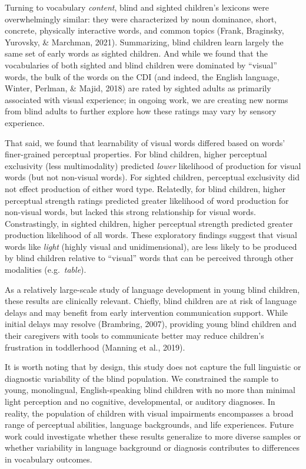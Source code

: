 \documentclass[
  man,floatsintext]{apa6}
\begin{document}
Turning to vocabulary \emph{content}, blind and sighted children's lexicons were overwhelmingly similar: they were characterized by noun dominance, short, concrete, physically interactive words, and common topics (Frank, Braginsky, Yurovsky, \& Marchman, 2021). Summarizing, blind children learn largely the same set of early words as sighted children. And while we found that the vocabularies of both sighted and blind children were dominated by ``visual'' words, the bulk of the words on the CDI (and indeed, the English language, Winter, Perlman, \& Majid, 2018) are rated by sighted adults as primarily associated with visual experience; in ongoing work, we are creating new norms from blind adults to further explore how these ratings may vary by sensory experience.

That said, we found that learnability of visual words differed based on words' finer-grained perceptual properties. For blind children, higher perceptual exclusivity (less multimodality) predicted \emph{lower} likelihood of production for visual words (but not non-visual words). For sighted children, perceptual exclusivity did not effect production of either word type. Relatedly, for blind children, higher perceptual strength ratings predicted greater likelihood of word production for non-visual words, but lacked this strong relationship for visual words. Constrastingly, in sighted children, higher perceptual strength predicted greater production likelihood of all words. These exploratory findings suggest that visual words like \emph{light} (highly visual and unidimensional), are less likely to be produced by blind children relative to ``visual'' words that can be perceived through other modalities (e.g.~\emph{table}).

As a relatively large-scale study of language development in young blind children, these results are clinically relevant. Chiefly, blind children are at risk of language delays and may benefit from early intervention communication support. While initial delays may resolve (Brambring, 2007), providing young blind children and their caregivers with tools to communicate better may reduce children's frustration in toddlerhood (Manning et al., 2019).

It is worth noting that by design, this study does not capture the full linguistic or diagnostic variability of the blind population. We constrained the sample to young, monolingual, English-speaking blind children with no more than minimal light perception and no cognitive, developmental, or auditory diagnoses. In reality, the population of children with visual impairments encompasses a broad range of perceptual abilities, language backgrounds, and life experiences. Future work could investigate whether these results generalize to more diverse samples or whether variability in language background or diagnosis contributes to differences in vocabulary outcomes.
\end{document}
